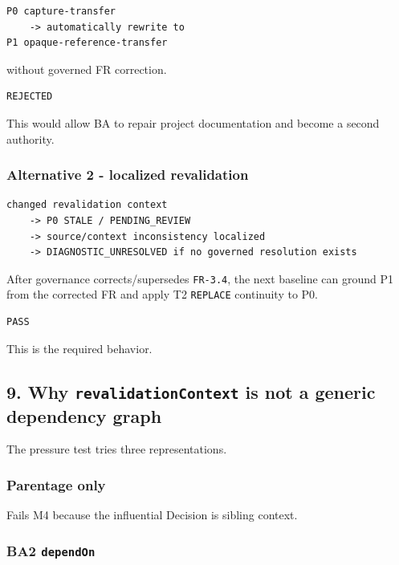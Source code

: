 \documentclass[11pt,a4paper]{article}
\begin{document}
\begin{verbatim}
P0 capture-transfer
    -> automatically rewrite to
P1 opaque-reference-transfer
\end{verbatim}

without governed FR correction.

\begin{verbatim}
REJECTED
\end{verbatim}

This would allow BA to repair project documentation and become a second
authority.

\subsubsection{Alternative 2 - localized
revalidation}\label{alternative-2---localized-revalidation}

\begin{verbatim}
changed revalidation context
    -> P0 STALE / PENDING_REVIEW
    -> source/context inconsistency localized
    -> DIAGNOSTIC_UNRESOLVED if no governed resolution exists
\end{verbatim}

After governance corrects/supersedes \texttt{FR-3.4}, the next baseline
can ground P1 from the corrected FR and apply T2 \texttt{REPLACE}
continuity to P0.

\begin{verbatim}
PASS
\end{verbatim}

This is the required behavior.

\subsection{\texorpdfstring{9. Why \texttt{revalidationContext} is not a
generic dependency
graph}{9. Why revalidationContext is not a generic dependency graph}}\label{why-revalidationcontext-is-not-a-generic-dependency-graph}

The pressure test tries three representations.

\subsubsection{Parentage only}\label{parentage-only}

Fails M4 because the influential Decision is sibling context.

\subsubsection{\texorpdfstring{BA2
\texttt{dependOn}}{BA2 dependOn}}\label{ba2-dependon}
\end{document}
